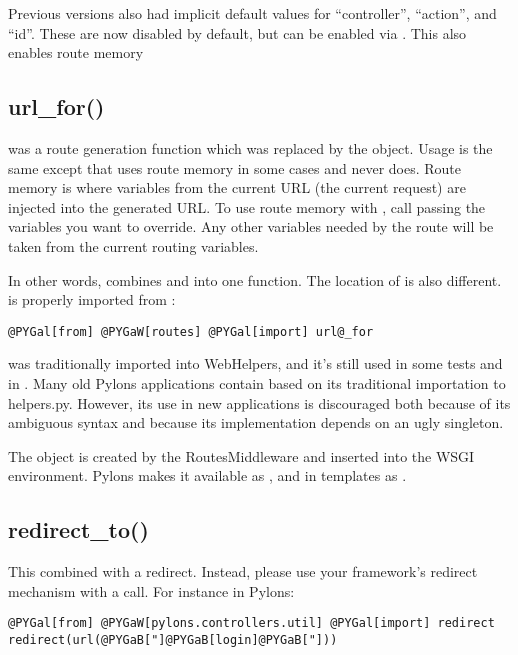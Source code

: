 \documentclass[letterpaper,10pt,english]{manual}
\begin{document}
Previous versions also had implicit default values for ``controller'',
``action'', and ``id''.  These are now disabled by default, but can be enabled via
.  This also enables route memory


\subsection{url\_for()}

 was a route generation function which was replaced by the 
object.  Usage is the same except that  uses route memory in some
cases and  never does.  Route memory is where variables from the current
URL (the current request) are injected into the generated URL.  To use route
memory with , call  passing the variables you want to
override.  Any other variables needed by the route will be taken from the
current routing variables.

In other words,  combines  and  into one
function.  The location of  is also different.   is
properly imported from :

\begin{Verbatim}[commandchars=@\[\]]
@PYGal[from] @PYGaW[routes] @PYGal[import] url@_for
\end{Verbatim}

 was traditionally imported into WebHelpers, and it's still used in
some tests and in .  Many old Pylons applications
contain  based on its traditional importation to helpers.py.
However, its use in new applications is discouraged both because of its
ambiguous syntax and because its implementation depends on an ugly singleton.

The  object is created by the RoutesMiddleware and inserted into the
WSGI environment.  Pylons makes it available as , and in
templates as .


\subsection{redirect\_to()}

This combined  with a redirect.  Instead, please use your
framework's redirect mechanism with a  call.  For instance in Pylons:

\begin{Verbatim}[commandchars=@\[\]]
@PYGal[from] @PYGaW[pylons.controllers.util] @PYGal[import] redirect
redirect(url(@PYGaB["]@PYGaB[login]@PYGaB["]))
\end{Verbatim}
\end{document}
